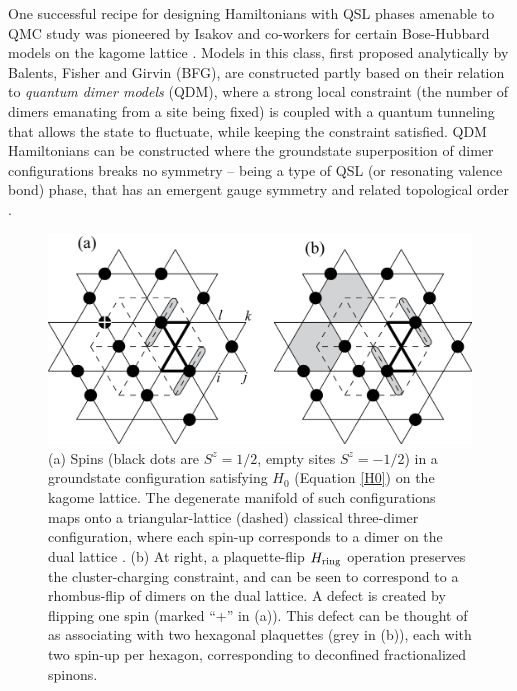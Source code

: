 \documentclass[range]{ar2e}
\begin{document}
One successful recipe for designing Hamiltonians with QSL phases amenable to QMC study was pioneered by Isakov and co-workers for certain Bose-Hubbard models on the kagome lattice \cite{Isakov1, Isakov2, TopoEE}.  Models in this class, first proposed analytically by Balents, Fisher and Girvin \cite{BFG} (BFG),
are constructed partly based on their relation to {\it quantum dimer models} (QDM), where a strong local constraint (the number of dimers emanating from a site being fixed) is coupled with a quantum tunneling that allows the state to fluctuate, while keeping the constraint satisfied.  QDM Hamiltonians can be constructed where the groundstate superposition of dimer configurations breaks no symmetry -- being a type of QSL (or resonating valence bond) phase, that has an emergent gauge symmetry and related topological order \cite{Misguich1}.


\begin{figure}
\centerline{\includegraphics[width=4.5in]{kagome}}
  \caption{ (a) Spins (black dots are $S^z = 1/2$, empty sites $S^z = -1/2$) in a groundstate configuration satisfying $H_0$ (Equation \ref{H0}) on the kagome lattice.  The degenerate manifold of such configurations maps onto a triangular-lattice (dashed) classical three-dimer configuration, where each spin-up corresponds to a dimer on the dual lattice \cite{BFG}.  (b) At right, a plaquette-flip $H_{\rm ring}$ operation preserves the cluster-charging constraint, and can be seen to correspond to a rhombus-flip of dimers on the dual lattice.  A defect is created by flipping one spin (marked ``+'' in (a)).  This defect can be thought of as associating with two hexagonal plaquettes (grey in (b)), each with two spin-up per hexagon, corresponding to deconfined fractionalized spinons.} \label{kag_fig}
\end{figure}
\end{document}
